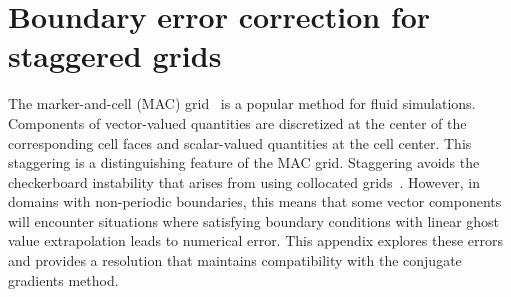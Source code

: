 \section{Boundary error correction for staggered grids}\label{sec:boundary-correction}

The marker-and-cell (MAC) grid~\cite{Welch:1965jv} is a popular method for fluid
simulations. Components of vector-valued quantities are discretized at the center of the
corresponding cell faces and scalar-valued quantities at the cell center. This
staggering is a distinguishing feature of the MAC grid. Staggering avoids the
checkerboard instability that arises from using collocated grids~\cite{Wesseling:2001ci}. 
However, in domains with non-periodic boundaries, this means that some vector components
will encounter situations where satisfying boundary conditions with linear ghost value
extrapolation leads to numerical error. This appendix explores these errors and provides
a resolution that maintains compatibility with the conjugate gradients method.

